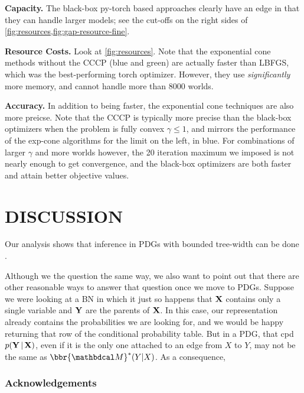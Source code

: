 \documentclass[twoside]{article}
\begin{document}
\textbf{Capacity.} 
The black-box py-torch based approaches clearly have an edge in that they can handle larger models; see the cut-offs on the right sides of \cref{fig:resources,fig:gap-resource-fine}.

\textbf{Resource Costs.} 
Look at \cref{fig:resources}. 
Note that the exponential cone methods without the CCCP (blue and green) are actually faster than LBFGS, which was the best-performing torch optimizer. 
However, they use \emph{significantly} more memory, and cannot handle more than 8000 worlds. 


\textbf{Accuracy.}
In addition to being faster, the exponential cone techniques are also more preicse.
Note that the CCCP is typically more precise than the black-box
optimizers when the problem is fully convex $\gamma \le 1$, and
mirrors the performance of the exp-cone algorithms for the
limit on the left, in blue.  For combinations of larger
$\gamma$ and more worlds however, the 20 iteration maximum we imposed
is not nearly enough to get convergence, and the black-box optimizers
are both faster and attain better objective values. 

\section{DISCUSSION}

Our analysis shows that inference in PDGs with bounded tree-width can be done .


Although we the question the same way, we also want to point out that there are other reasonable ways to answer that question once we move to PDGs.
Suppose we were looking at a BN in which it just so happens that $\mathbf{X}$ contains only a single variable and $\mathbf{Y}$ are the parents of $\mathbf{X}$.
In this case, our representation already contains the probabilities we are looking for, and we would be happy returning that row of the conditional probability table. 
But in a PDG, that cpd $p(\mathbf{Y} \,|\,\mathbf{X})$, even if it is the only one
attached to an edge from $X$ to $Y$, may not be the same as $\bbr{\dg M}^*(Y|X)$.
As a consequence, 




\subsubsection*{Acknowledgements}
\end{document}
